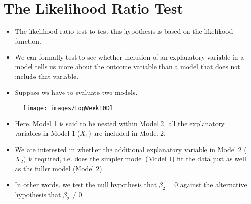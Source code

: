 \documentclass[a4paper,12pt]{article}
\begin{document}





	
\newpage	
\section*{The Likelihood Ratio Test}
\begin{itemize}
	\item The likelihood ratio test to test this hypothesis is based on the likelihood
	function.
	\item  We can formally test to see whether inclusion of an explanatory variable in a model tells us
	more about the outcome variable than a model that does not include that variable.
	\item  Suppose
	we have to evaluate two models. 
\end{itemize}


\begin{center}
\begin{figure}[h!]
	\centering
\texttt{[image: images/LogWeek10D]}\\

\end{figure}
\end{center}
\begin{itemize}
\item Here, Model 1 is said to be nested within Model 2  all the explanatory variables in Model 1
($X_1$) are included in Model 2. 
\item We are interested in whether the additional explanatory
variable in Model 2 ($X_2$) is required, i.e. does the simpler model (Model 1) fit the data just as
well as the fuller model (Model 2). 
\item In other words, we test the null hypothesis that $\beta_2 = 0$
against the alternative hypothesis that $\beta_2 \neq 0$. 
\end{itemize}
\end{document}
